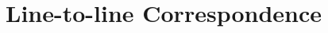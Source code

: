 \documentclass{beamer}
\newcommand{\cmark}{\ding{51}}
\newcommand{\xmark}{\ding{55}}
\begin{document}
%
%
%

\section{Line-to-line Correspondence}
\end{document}
